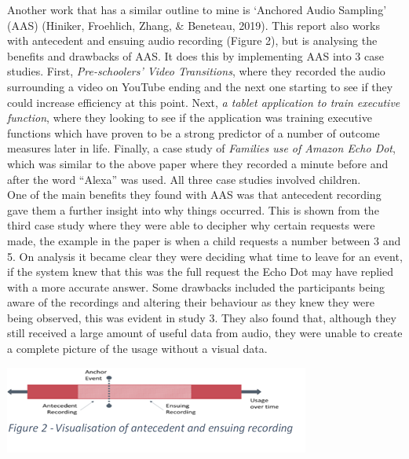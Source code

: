 \documentclass[a4paper,11pt]{report}
\begin{document}
Another work that has a similar outline to mine is ‘Anchored Audio Sampling’ (AAS) (Hiniker, Froehlich, Zhang, \& Beneteau, 2019). This report also works with antecedent and ensuing audio recording (Figure 2), but is analysing the benefits and drawbacks of AAS. It does this by implementing AAS into 3 case studies. First, \textit{Pre-schoolers’ Video Transitions}, where they recorded the audio surrounding a video on YouTube ending and the next one starting to see if they could increase efficiency at this point. Next, \textit{a tablet application to train executive function}, where they looking to see if the application was training executive functions which have proven to be a strong predictor of a number of outcome measures later in life. Finally, a case study of \textit{Families use of Amazon Echo Dot}, which was similar to the above paper where they recorded a minute before and after the word “Alexa” was used. All three case studies involved children. \\

One of the main benefits they found with AAS was that antecedent recording gave them a further insight into why things occurred. This is shown from the third case study where they were able to decipher why certain requests were made, the example in the paper is when a child requests a number between 3 and 5. On analysis it became clear they were deciding what time to leave for an event, if the system knew that this was the full request the Echo Dot may have replied with a more accurate answer. Some drawbacks included the participants being aware of the recordings and altering their behaviour as they knew they were being observed, this was evident in study 3. They also found that, although they still received a large amount of useful data from audio, they were unable to create a complete picture of the usage without a visual data.\\

\begin{center}
\includegraphics{Recording.PNG}
\end{center}
\end{document}
